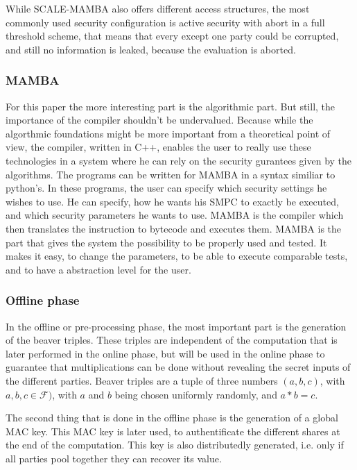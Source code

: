 \documentclass[english,runningheads,a4paper]{llncs}[2018/03/10]
\begin{document}
While SCALE-MAMBA also offers different access structures, the most commonly used security configuration is active security with abort in a full threshold scheme, that means that every except one party could be corrupted, and still no information is leaked, because the evaluation is aborted.

\subsubsection{MAMBA}
For this paper the more interesting part is the algorithmic part. But still, the importance of the compiler shouldn't be undervalued. Because while the algorthmic foundations might be more important from a theoretical point of view, the compiler, written in C++, enables the user to really use these technologies in a system where he can rely on the security gurantees given by the algorithms. The programs can be written for MAMBA in a syntax similiar to python's. In these programs, the user can specify which security settings he wishes to use. He can specify, how he wants his SMPC to exactly be executed, and which security parameters he wants to use. MAMBA is the compiler which then translates the instruction to bytecode and executes them. MAMBA is the part that gives the system the possibility to be properly used and tested. It makes it easy, to change the parameters, to be able to execute comparable tests, and to have a abstraction level for the user.\\


\subsubsection{Offline phase}


In the offline or pre-processing phase, the most important part is the generation of the beaver triples. These triples  are independent of the computation that is later performed in the online phase, but will be used in the online phase to guarantee that multiplications can be done without revealing the secret inputs of the different parties.
Beaver triples are a tuple of three numbers \((a,b,c)\), with \( a,b,c\in \mathcal{F} )\), with \(a\) and \(b\) being chosen uniformly randomly, and \(a*b=c\).

The second thing that is done in the offline phase is the generation of a global MAC key. This MAC key is later used, to authentificate the different shares at the end of the computation. This key is also distributedly generated, i.e. only if all parties pool together they can recover its value.\\
\end{document}
